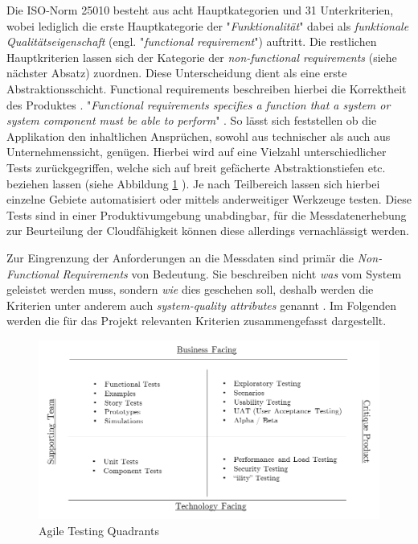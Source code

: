 Die ISO-Norm 25010 besteht aus acht Hauptkategorien und 31 Unterkriterien, wobei lediglich die erste Hauptkategorie der "\emph{Funktionalität}" dabei als \emph{funktionale Qualitätseigenschaft} (engl. "\emph{functional requirement}") auftritt. Die restlichen Hauptkriterien lassen sich der Kategorie der \emph{non-functional requirements} (siehe nächster Absatz) zuordnen. Diese Unterscheidung dient als eine erste Abstraktionsschicht. Functional requirements beschreiben hierbei die Korrektheit des Produktes \cite[Seite~335]{continuous-delivery}. "\emph{Functional requirements specifies a function that a system or system component must
be able to perform}" \cite[Seite~19]{eide-requirements}. So lässt sich feststellen ob die Applikation den inhaltlichen Ansprüchen, sowohl aus technischer als auch aus Unternehmenssicht, genügen. Hierbei wird auf eine Vielzahl unterschiedlicher Tests zurückgegriffen, welche sich auf breit gefächerte Abstraktionstiefen etc. beziehen lassen (siehe Abbildung \ref{fig:testing-quad} ). Je nach Teilbereich lassen sich hierbei einzelne Gebiete automatisiert oder mittels anderweitiger Werkzeuge testen. Diese Tests sind in einer Produktivumgebung unabdingbar, für die Messdatenerhebung zur Beurteilung der Cloudfähigkeit können diese allerdings vernachlässigt werden. 

Zur Eingrenzung der Anforderungen an die Messdaten sind primär die \emph{Non-Functional Requirements} von Bedeutung. Sie beschreiben nicht \emph{was} vom System geleistet werden muss, sondern \emph{wie} dies geschehen soll, deshalb werden die Kriterien unter anderem auch \emph{system-quality attributes} genannt \cite[Seite~335]{continuous-delivery}. Im Folgenden werden die für das Projekt relevanten Kriterien zusammengefasst dargestellt.

\begin{figure}[h!]
	\centering
	\includegraphics[width=\linewidth]{kapitel/vorgehensmodell/kriterienkatalog/_img/agile-testing-quadrants}
	\caption[Agile Testing Quadrants]{Agile Testing Quadrants}
	\label{fig:testing-quad}
\end{figure}




